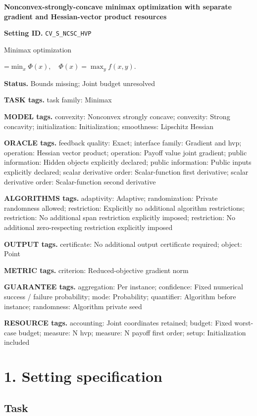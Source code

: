 \documentclass[10pt,a4paper]{article}
\newcommand{\AtlasMath}[1]{\par\begingroup\centering\setbox0=\hbox{$\displaystyle #1$}\ifdim\wd0>1.4\linewidth\typeout{ATLAS WIDE FORMULA: \the\wd0}\fi\ifdim\wd0>\linewidth\resizebox{\linewidth}{!}{\box0}\else\box0\fi\par\endgroup}
\begin{document}
\raggedright

{\LARGE\bfseries\sffamily\color{AtlasNavy} Nonconvex-strongly-concave minimax optimization with separate gradient and Hessian-vector product resources\par}\vspace{5pt}
\textbf{Setting ID.} \texttt{CV\_\allowbreak{}\allowbreak{}S\_\allowbreak{}\allowbreak{}NCSC\_\allowbreak{}\allowbreak{}HVP}

Minimax optimization


\AtlasMath{\min_x\Phi(x),\quad\Phi(x)=\max_y f(x,y).}


\textbf{Status.} Bounds missing; Joint budget unresolved

\textbf{TASK tags.} task family: Minimax

\textbf{MODEL tags.} convexity: Nonconvex strongly concave; convexity: Strong concavity; initialization: Initialization; smoothness: Lipschitz Hessian

\textbf{ORACLE tags.} feedback quality: Exact; interface family: Gradient and hvp; operation: Hessian vector product; operation: Payoff value joint gradient; public information: Hidden objects explicitly declared; public information: Public inputs explicitly declared; scalar derivative order: Scalar-function first derivative; scalar derivative order: Scalar-function second derivative

\textbf{ALGORITHMS tags.} adaptivity: Adaptive; randomization: Private randomness allowed; restriction: Explicitly no additional algorithm restrictions; restriction: No additional span restriction explicitly imposed; restriction: No additional zero-respecting restriction explicitly imposed

\textbf{OUTPUT tags.} certificate: No additional output certificate required; object: Point

\textbf{METRIC tags.} criterion: Reduced-objective gradient norm

\textbf{GUARANTEE tags.} aggregation: Per instance; confidence: Fixed numerical success / failure probability; mode: Probability; quantifier: Algorithm before instance; randomness: Algorithm private seed

\textbf{RESOURCE tags.} accounting: Joint coordinates retained; budget: Fixed worst-case budget; measure: N hvp; measure: N payoff first order; setup: Initialization included

\section{1. Setting specification}
\subsection{Task}
\end{document}
